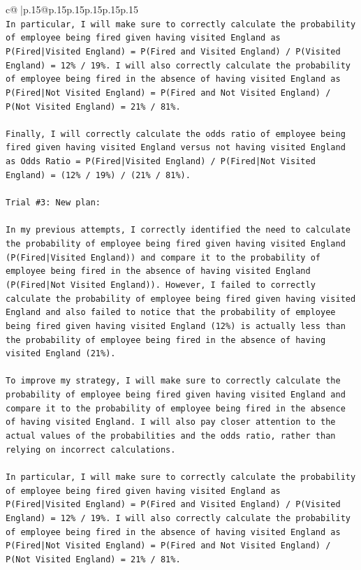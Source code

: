 \documentclass{article}
\begin{document}
{\begin{supertabular}{c@{$\;$}|p{.15\linewidth}@{}p{.15\linewidth}p{.15\linewidth}p{.15\linewidth}p{.15\linewidth}p{.15\linewidth}}
{{{\\ 
\texttt{In particular, I will make sure to correctly calculate the probability of employee being fired given having visited England as P(Fired|Visited England) = P(Fired and Visited England) / P(Visited England) = 12\% / 19\%. I will also correctly calculate the probability of employee being fired in the absence of having visited England as P(Fired|Not Visited England) = P(Fired and Not Visited England) / P(Not Visited England) = 21\% / 81\%. } \\
\\ 
\texttt{Finally, I will correctly calculate the odds ratio of employee being fired given having visited England versus not having visited England as Odds Ratio = P(Fired|Visited England) / P(Fired|Not Visited England) = (12\% / 19\%) / (21\% / 81\%).} \\
\\ 
\texttt{Trial \#3: New plan: } \\
\\ 
\texttt{In my previous attempts, I correctly identified the need to calculate the probability of employee being fired given having visited England (P(Fired|Visited England)) and compare it to the probability of employee being fired in the absence of having visited England (P(Fired|Not Visited England)). However, I failed to correctly calculate the probability of employee being fired given having visited England and also failed to notice that the probability of employee being fired given having visited England (12\%) is actually less than the probability of employee being fired in the absence of having visited England (21\%). } \\
\\ 
\texttt{To improve my strategy, I will make sure to correctly calculate the probability of employee being fired given having visited England and compare it to the probability of employee being fired in the absence of having visited England. I will also pay closer attention to the actual values of the probabilities and the odds ratio, rather than relying on incorrect calculations. } \\
\\ 
\texttt{In particular, I will make sure to correctly calculate the probability of employee being fired given having visited England as P(Fired|Visited England) = P(Fired and Visited England) / P(Visited England) = 12\% / 19\%. I will also correctly calculate the probability of employee being fired in the absence of having visited England as P(Fired|Not Visited England) = P(Fired and Not Visited England) / P(Not Visited England) = 21\% / 81\%. } \\
}}}
\end{supertabular}}
\end{document}
